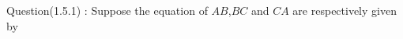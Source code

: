 \documentclass[journal,12pt,twocolumn]{IEEEtran}
\theoremstyle{remark}
\begin{document}



\maketitle

\newpage


\bigskip

\renewcommand{\thefigure}{\theenumi}
\renewcommand{\thetable}{\theenumi}

%




%
Question(1.5.1) : 
Suppose the equation of $AB$,$BC$ and $CA$ are respectively given by 
\end{document}
